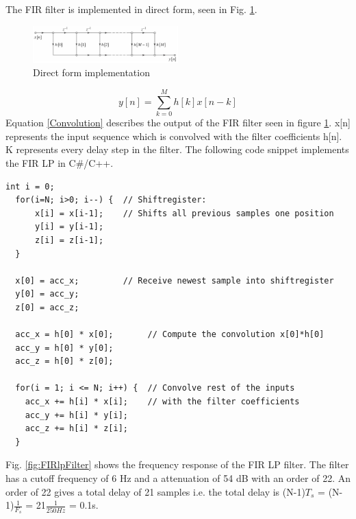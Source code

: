 The FIR filter is implemented in direct form, seen in Fig. \ref{fig:directForm}.
\begin{figure}[H]
    \centering
         \includegraphics[width = 0.5\textwidth]{VAPIQ-PICTURES/DirectFormImplementation.jpg}
      \caption{Direct form implementation}
    \label{fig:directForm}
\end{figure}
\begin{equation}
    y[n] = \sum_{k = 0}^{M} h[k]x[n-k]
    \label{Convolution}
\end{equation}
Equation \ref{Convolution} describes the output of the FIR filter seen in figure \ref{fig:directForm}. x[n] represents the input sequence which is convolved with the filter coefficients h[n]. K represents every delay step in the filter. The following code snippet implements the FIR LP in C\#/C++.
\begin{lstlisting}[frame=single]  % Start your code-block
int i = 0;
  for(i=N; i>0; i--) {  // Shiftregister:
      x[i] = x[i-1];    // Shifts all previous samples one position
      y[i] = y[i-1];
      z[i] = z[i-1];
  }

  x[0] = acc_x;         // Receive newest sample into shiftregister
  y[0] = acc_y;
  z[0] = acc_z;

  acc_x = h[0] * x[0];       // Compute the convolution x[0]*h[0]
  acc_y = h[0] * y[0];
  acc_z = h[0] * z[0];
 
  for(i = 1; i <= N; i++) {  // Convolve rest of the inputs
    acc_x += h[i] * x[i];    // with the filter coefficients
    acc_y += h[i] * y[i];
    acc_z += h[i] * z[i];
  }
\end{lstlisting}
Fig. \ref{fig:FIRlpFilter} shows the frequency response of the FIR LP filter. The filter has a cutoff frequency of 6 Hz and a attenuation of 54 dB with an order of 22. An order of 22 gives a total delay of 21 samples i.e. the total delay is (N-1)$T_s$ = (N-1)$\frac{1}{F_s}$ = 21$\frac{1}{250Hz}$ = 0.1s.
